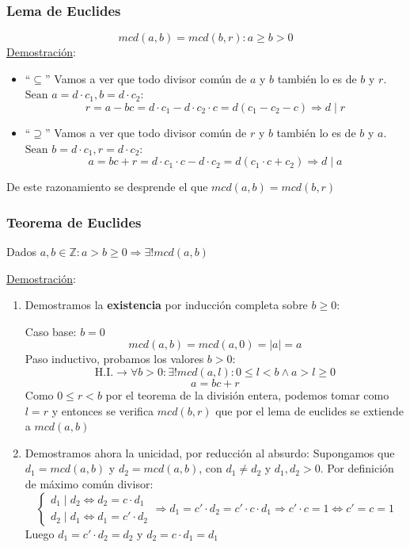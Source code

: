 \documentclass[10pt,a4paper,openright]{book}
\begin{document}
\subsubsection*{Lema de Euclides}
$$mcd(a,b)=mcd(b,r): a\geq b>0$$
\underline{Demostración}:
\begin{itemize}
\item ``$\subseteq$'' Vamos a ver que todo divisor común de $a$ y $b$ también lo es de $b$ y $r$. $\mbox{Sean }a=d\cdot c_1, b=d\cdot c_2$:
$$r=a-bc=d\cdot c_1-d\cdot c_2\cdot c=d(c_1-c_2-c)\Rightarrow d\mid r$$

\item ``$\supseteq$'' Vamos a ver que todo divisor común de $r$ y $b$ también lo es de $b$ y $a$. $\mbox{Sean }b=d\cdot c_1, r=d\cdot c_2$:
$$a=bc+r=d\cdot c_1\cdot c-d\cdot c_2=d(c_1\cdot c+c_2)\Rightarrow d\mid a$$
\end{itemize}
De este razonamiento se desprende el que $mcd(a,b)=mcd(b,r)$

\subsubsection*{Teorema de Euclides}
Dados $a,b\in \mathbb Z: a>b\geq 0\Rightarrow \exists! mcd(a,b)$\par
\underline{Demostración}:

\begin{enumerate}
\item Demostramos la \textbf{existencia} por inducción completa sobre $b\geq 0$:\par
	Caso base: $b=0$
	$$mcd(a,b)=mcd(a,0)=|a|=a$$
	Paso inductivo, probamos los valores $b>0$:
	$$\mbox{H.I.}\rightarrow \forall b>0: \exists! mcd(a,l): 0\leq l<b \wedge a>l\geq 0$$
	$$a=bc+r$$
	Como $0\leq r<b$ por el teorema de la división entera, podemos tomar como $l=r$ y entonces se verifica $mcd(b,r)$ que por el lema de euclides se extiende a $mcd(a,b)$
	
\item Demostramos ahora la unicidad, por reducción al absurdo:
Supongamos que $d_1=mcd(a,b)$ y $d_2=mcd(a,b)$, con $d_1\neq d_2$ y $d_1,d_2>0$. Por definición de máximo común divisor:
$$
\begin{cases}
d_1\mid d_2\Leftrightarrow d_2=c\cdot d_1 \\
d_2\mid d_1\Leftrightarrow d_1=c'\cdot d_2 
\end{cases}\Rightarrow d_1=c'\cdot d_2=c'\cdot c\cdot d_1\Rightarrow c'\cdot c=1\Leftrightarrow c'=c=1
$$
Luego $d_1=c'\cdot d_2=d_2$ y $d_2=c\cdot d_1=d_1$
\end{enumerate}
\end{document}
